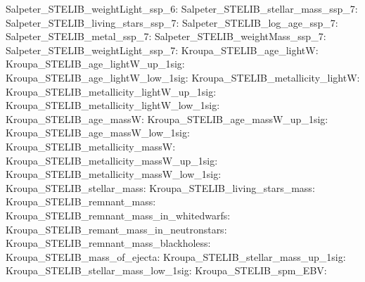 Salpeter\_STELIB\_weightLight\_ssp\_6:  \newline 
Salpeter\_STELIB\_stellar\_mass\_ssp\_7:  \newline 
Salpeter\_STELIB\_living\_stars\_ssp\_7:  \newline 
Salpeter\_STELIB\_log\_age\_ssp\_7:  \newline 
Salpeter\_STELIB\_metal\_ssp\_7:  \newline 
Salpeter\_STELIB\_weightMass\_ssp\_7:  \newline 
Salpeter\_STELIB\_weightLight\_ssp\_7:  \newline 
Kroupa\_STELIB\_age\_lightW:  \newline 
Kroupa\_STELIB\_age\_lightW\_up\_1sig:  \newline 
Kroupa\_STELIB\_age\_lightW\_low\_1sig:  \newline 
Kroupa\_STELIB\_metallicity\_lightW:  \newline 
Kroupa\_STELIB\_metallicity\_lightW\_up\_1sig:  \newline 
Kroupa\_STELIB\_metallicity\_lightW\_low\_1sig:  \newline 
Kroupa\_STELIB\_age\_massW:  \newline 
Kroupa\_STELIB\_age\_massW\_up\_1sig:  \newline 
Kroupa\_STELIB\_age\_massW\_low\_1sig:  \newline 
Kroupa\_STELIB\_metallicity\_massW:  \newline 
Kroupa\_STELIB\_metallicity\_massW\_up\_1sig:  \newline 
Kroupa\_STELIB\_metallicity\_massW\_low\_1sig:  \newline 
Kroupa\_STELIB\_stellar\_mass:  \newline 
Kroupa\_STELIB\_living\_stars\_mass:  \newline 
Kroupa\_STELIB\_remnant\_mass:  \newline 
Kroupa\_STELIB\_remnant\_mass\_in\_whitedwarfs:  \newline 
Kroupa\_STELIB\_remant\_mass\_in\_neutronstars:  \newline 
Kroupa\_STELIB\_remnant\_mass\_blackholess:  \newline 
Kroupa\_STELIB\_mass\_of\_ejecta:  \newline 
Kroupa\_STELIB\_stellar\_mass\_up\_1sig:  \newline 
Kroupa\_STELIB\_stellar\_mass\_low\_1sig:  \newline 
Kroupa\_STELIB\_spm\_EBV:  \newline 
